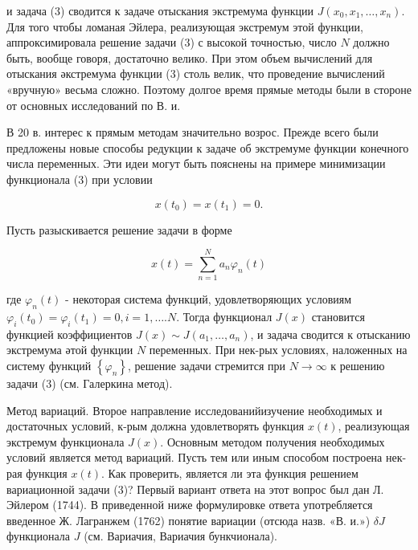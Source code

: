 \documentclass[10pt]{article}
\begin{document}
и задача (3) сводится к задаче отыскания экстремума функции $J\left(x_{0}, x_{1}, \ldots, x_{n}\right)$. Для того чтобы ломаная Эйлера, реализующая экстремум этой функции, аппроксимировала решение задачи (3) с высокой точностью, число $N$ должно быть, вообще говоря, достаточно велико. При этом объем вычислений для отыскания әкстремума функции (3) столь велик, что проведение вычислений «вручную» весьма сложно. Поэтому долгое время прямые методы были в стороне от основных исследований по В. и.



В 20 в. интерес к прямым методам значительно возрос. Прежде всего были предложены новые способы редукции к задаче об экстремуме функции конечного числа переменных. Эти идеи могут быть пояснены на примере минимизации функционала (3) при условии



\[

x\left(t_{0}\right)=x\left(t_{1}\right)=0 .

\]



Пусть разыскивается решение задачи в форме



\[

x(t)=\sum_{n=1}^{N} a_{n} \varphi_{n}(t)

\]



где $\varphi_{n}(t)$ - некоторая система функций, удовлетворяющих условиям $\varphi_{i}\left(t_{0}\right)=\varphi_{i}\left(t_{1}\right)=0, i=1, \ldots . N$. Тогда функционал $J(x)$ становится функцией коэффициентов $J(x) \sim J\left(a_{1}, \ldots, a_{n}\right)$, и задача сводится к отысканию экстремума әтой функции $N$ переменных. При нек-рых условиях, наложенных на систему функций $\left\{\varphi_{n}\right\}$, решение задачи стремится при $N \rightarrow \infty$ к решению задачи (3) (см. Галеркина метод).



Метод вариаций. Второе направление исследованийизучение необходимых и достаточных условий, к-рым должна удовлетворять функция $x(t)$, реализующая экстремум функционала $J(x)$. Основным методом получения необходимых условий является метод вариаций. Пусть тем или иным способом построена нек-рая функция $x(t)$. Как проверить, является ли эта функция решением вариационной задачи (3)? Первый вариант ответа на этот вопрос был дан Л. Эйлером (1744). В приведенной ниже формулировке ответа употребляется введенное Ж. Лагранжем (1762) понятие вариации (отсюда назв. «В. и.») $\delta J$ функционала $J$ (см. Вариачия, Вариачия бункчионала).
\end{document}
